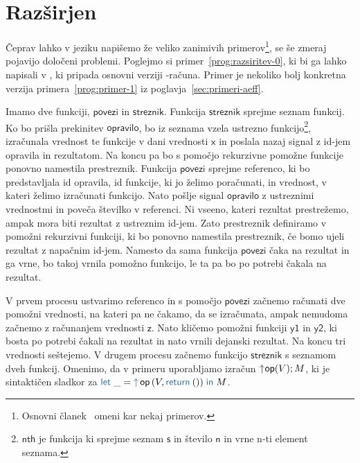 \section{Razširjen \lae{}}\label{sec:razsirjen-lae}

Čeprav lahko v jeziku \aeff{} napišemo že veliko zanimivih primerov\footnote{Osnovni članek~\cite{aeff} omeni kar nekaj primerov.}, se še zmeraj pojavijo določeni problemi.
Poglejmo si primer~\ref{prog:razsiritev-0}, ki bi ga lahko napisali v \aeff{}, ki pripada osnovni verziji \lae{}\nobreakdash-računa. Primer je nekoliko bolj konkretna verzija primera~\ref{prog:primer-1} iz poglavja~\ref{sec:primeri-aeff}.

Imamo dve funkciji, $\mathsf{povezi}$ in $\mathsf{streznik}$.
Funkcija $\mathsf{streznik}$ sprejme seznam funkcij. Ko bo prišla prekinitev $\mathsf{opravilo}$, bo iz seznama vzela ustrezno funkcijo\footnote{$\mathsf{nth}$ je funkcija ki sprejme seznam $\mathsf{s}$ in število $\mathsf{n}$ in vrne n-ti element seznama.}, izračunala vrednost te funkcije v dani vrednosti $\mathsf{x}$ in poslala nazaj signal z id-jem opravila in rezultatom. Na koncu pa bo s pomočjo rekurzivne pomožne funkcije ponovno namestila prestreznik.
Funkcija $\mathsf{povezi}$ sprejme referenco, ki bo predstavljala id opravila, id funkcije, ki jo želimo poračunati, in vrednost, v kateri želimo izračunati funkcijo.
Nato pošlje signal $\mathsf{opravilo}$ z ustreznimi vrednostmi in poveča številko v referenci.
Ni vseeno, kateri rezultat prestrežemo, ampak mora biti rezultat z ustreznim id-jem. Zato prestreznik definiramo v pomožni rekurzivni funkciji, ki bo ponovno namestila prestreznik, če bomo ujeli rezultat z napačnim id-jem.
Namesto da sama funkcija $\mathsf{povezi}$ čaka na rezultat in ga vrne, bo takoj vrnila pomožno funkcijo, le ta pa bo po potrebi čakala na rezultat.  

V prvem procesu ustvarimo referenco in s pomočjo $\mathsf{povezi}$ začnemo računati dve pomožni vrednosti, na kateri pa ne čakamo, da se izračunata, ampak nemudoma začnemo z računanjem vrednosti $\mathsf{z}$. Nato kličemo pomožni funkciji $\mathsf{y1}$ in $\mathsf{y2}$, ki bosta po potrebi čakali na rezultat in nato vrnili dejanski rezultat. Na koncu tri vrednosti seštejemo.
V drugem procesu začnemo funkcijo $\mathsf{streznik}$ s seznamom dveh funkcij.
Omenimo, da v primeru uporabljamo izračun $\uparrow\hspace{-0.5ex}\mathsf{op} (V);M$, ki je sintaktičen sladkor za $\tmlet{\_}{\tmopout{op}{V}{\tmreturn{()}}}{M}$.

